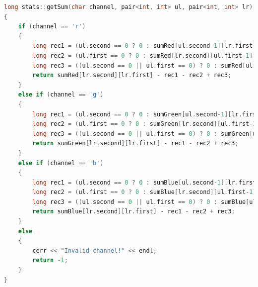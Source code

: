 \documentclass[UTF8]{ctexart}
\begin{document}
\begin{lstlisting}[language=C++,caption={twoDTree.cpp},label={twoDTree.cpp}]
long stats::getSum(char channel, pair<int, int> ul, pair<int, int> lr)
{
    if (channel == 'r')
    {
		long rec1 = (ul.second == 0 ? 0 : sumRed[ul.second-1][lr.first]);
        long rec2 = (ul.first == 0 ? 0 : sumRed[lr.second][ul.first-1]);
        long rec3 = ((ul.second == 0 || ul.first == 0) ? 0 : sumRed[ul.second-1][ul.first-1]);
        return sumRed[lr.second][lr.first] - rec1 - rec2 + rec3;   
	}
    else if (channel == 'g')
    {
		long rec1 = (ul.second == 0 ? 0 : sumGreen[ul.second-1][lr.first]);
        long rec2 = (ul.first == 0 ? 0 : sumGreen[lr.second][ul.first-1]);
        long rec3 = ((ul.second == 0 || ul.first == 0) ? 0 : sumGreen[ul.second-1][ul.first-1]);
        return sumGreen[lr.second][lr.first] - rec1 - rec2 + rec3;
	}
    else if (channel == 'b')
    {
		long rec1 = (ul.second == 0 ? 0 : sumBlue[ul.second-1][lr.first]);
        long rec2 = (ul.first == 0 ? 0 : sumBlue[lr.second][ul.first-1]);
        long rec3 = ((ul.second == 0 || ul.first == 0) ? 0 : sumBlue[ul.second-1][ul.first-1]);
        return sumBlue[lr.second][lr.first] - rec1 - rec2 + rec3;
	}
    else
    {
        cerr << "Invalid channel!" << endl;
        return -1;
    }
}


\end{lstlisting}
\end{document}

